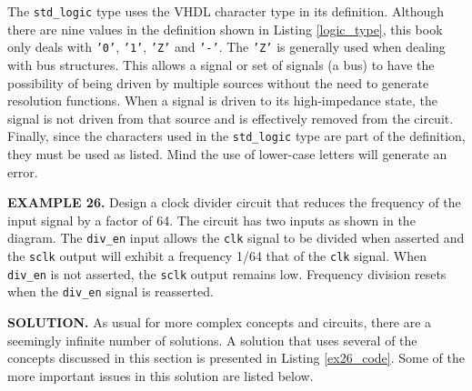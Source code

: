 The \texttt{std\_logic} type uses the VHDL character type in its definition. Although there are nine values in the definition shown in Listing \ref{logic_type}, this book only deals with \texttt{'0'},  \texttt{'1'},  \texttt{'Z'} and  \texttt{'-'}. The  \texttt{'Z'} is generally used when dealing with bus structures. This allows a signal or set of signals (a bus) to have the possibility of being driven by multiple sources without the need to generate resolution functions. When a signal is driven to its high-impedance state, the signal is not driven from that source and is effectively removed from the circuit. Finally, since the characters used in the \texttt{std\_logic} type are part of the definition, they must be used as listed. Mind the use of lower-case letters will generate an error. 
\begin{leftbar}
\begin{minipage}[t]{0.52\textwidth}
\vspace{10pt}
\noindent
\textbf{EXAMPLE 26.}
Design a clock divider circuit that reduces the frequency of the input signal by a factor of 64. The circuit has two inputs as shown in the diagram. The  \texttt{div\_en} input allows the  \texttt{clk} signal to be divided when asserted and the  \texttt{sclk} output will exhibit a frequency 1/64 that of the  \texttt{clk} signal. When  \texttt{div\_en} is not asserted, the  \texttt{sclk} output remains low. Frequency division resets when the  \texttt{div\_en} signal is reasserted.
\end{minipage}
\begin{minipage}[t]{0.4\linewidth}
\vspace{10pt}
\begin{flushright}
\end{flushright}
\end{minipage}
\end{leftbar}
\noindent
\textbf{SOLUTION.} As usual for more complex concepts and circuits, there are a seemingly infinite number of solutions. A solution that uses several of the concepts discussed in this section is presented in Listing \ref{ex26_code}. Some of the more important issues in this solution are listed below.

